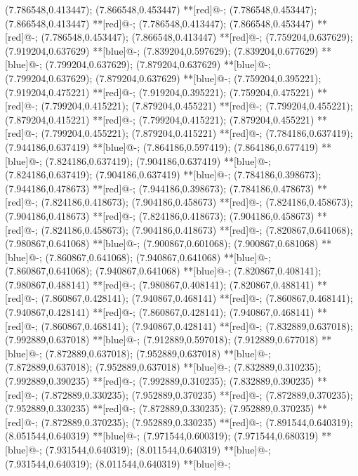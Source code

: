 (7.786548,0.413447); (7.866548,0.453447) **[red]@{-};
(7.786548,0.453447); (7.866548,0.413447) **[red]@{-};
(7.786548,0.413447); (7.866548,0.453447) **[red]@{-};
(7.786548,0.453447); (7.866548,0.413447) **[red]@{-};
(7.759204,0.637629); (7.919204,0.637629) **[blue]@{-};
(7.839204,0.597629); (7.839204,0.677629) **[blue]@{-};
(7.799204,0.637629); (7.879204,0.637629) **[blue]@{-};
(7.799204,0.637629); (7.879204,0.637629) **[blue]@{-};
(7.759204,0.395221); (7.919204,0.475221) **[red]@{-};
(7.919204,0.395221); (7.759204,0.475221) **[red]@{-};
(7.799204,0.415221); (7.879204,0.455221) **[red]@{-};
(7.799204,0.455221); (7.879204,0.415221) **[red]@{-};
(7.799204,0.415221); (7.879204,0.455221) **[red]@{-};
(7.799204,0.455221); (7.879204,0.415221) **[red]@{-};
(7.784186,0.637419); (7.944186,0.637419) **[blue]@{-};
(7.864186,0.597419); (7.864186,0.677419) **[blue]@{-};
(7.824186,0.637419); (7.904186,0.637419) **[blue]@{-};
(7.824186,0.637419); (7.904186,0.637419) **[blue]@{-};
(7.784186,0.398673); (7.944186,0.478673) **[red]@{-};
(7.944186,0.398673); (7.784186,0.478673) **[red]@{-};
(7.824186,0.418673); (7.904186,0.458673) **[red]@{-};
(7.824186,0.458673); (7.904186,0.418673) **[red]@{-};
(7.824186,0.418673); (7.904186,0.458673) **[red]@{-};
(7.824186,0.458673); (7.904186,0.418673) **[red]@{-};
(7.820867,0.641068); (7.980867,0.641068) **[blue]@{-};
(7.900867,0.601068); (7.900867,0.681068) **[blue]@{-};
(7.860867,0.641068); (7.940867,0.641068) **[blue]@{-};
(7.860867,0.641068); (7.940867,0.641068) **[blue]@{-};
(7.820867,0.408141); (7.980867,0.488141) **[red]@{-};
(7.980867,0.408141); (7.820867,0.488141) **[red]@{-};
(7.860867,0.428141); (7.940867,0.468141) **[red]@{-};
(7.860867,0.468141); (7.940867,0.428141) **[red]@{-};
(7.860867,0.428141); (7.940867,0.468141) **[red]@{-};
(7.860867,0.468141); (7.940867,0.428141) **[red]@{-};
(7.832889,0.637018); (7.992889,0.637018) **[blue]@{-};
(7.912889,0.597018); (7.912889,0.677018) **[blue]@{-};
(7.872889,0.637018); (7.952889,0.637018) **[blue]@{-};
(7.872889,0.637018); (7.952889,0.637018) **[blue]@{-};
(7.832889,0.310235); (7.992889,0.390235) **[red]@{-};
(7.992889,0.310235); (7.832889,0.390235) **[red]@{-};
(7.872889,0.330235); (7.952889,0.370235) **[red]@{-};
(7.872889,0.370235); (7.952889,0.330235) **[red]@{-};
(7.872889,0.330235); (7.952889,0.370235) **[red]@{-};
(7.872889,0.370235); (7.952889,0.330235) **[red]@{-};
(7.891544,0.640319); (8.051544,0.640319) **[blue]@{-};
(7.971544,0.600319); (7.971544,0.680319) **[blue]@{-};
(7.931544,0.640319); (8.011544,0.640319) **[blue]@{-};
(7.931544,0.640319); (8.011544,0.640319) **[blue]@{-};
